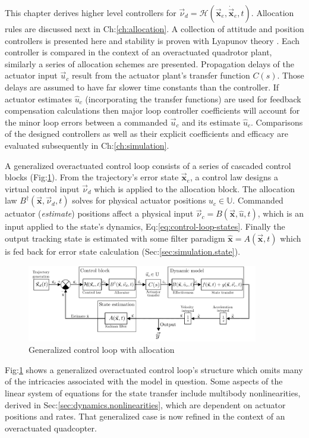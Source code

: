 This chapter derives higher level controllers for $\vec{\nu}_d=\mathcal{H}(\vec{\mathbf{x}}_e,\dot{\vec{\mathbf{x}}}_e,t)$. Allocation rules are discussed next in Ch:\ref{ch:allocation}. A collection of attitude and position controllers is presented here and stability is proven with Lyapunov theory \cite{lyapunovconference}. Each controller is compared in the context of an overactuated quadrotor plant, similarly a series of allocation schemes are presented. Propagation delays of the actuator input $\vec{u}_c$ result from the actuator plant's transfer function $C(s)$. Those delays are assumed to have far slower time constants than the controller. If actuator estimates $\hat{u}_c$ (incorporating the transfer functions) are used for feedback compensation calculations then major loop controller coefficients will account for the minor loop errors between a commanded $\vec{u}_c$ and its estimate $\hat{u}_c$. Comparisons of the designed controllers as well as their explicit coefficients and efficacy are evaluated subsequently in Ch:\ref{ch:simulation}. 
\par
A generalized overactuated control loop consists of a series of cascaded control blocks (Fig:\ref{fig:control-loop}). From the trajectory's error state $\vec{\mathbf{x}}_e$, a control law designs a virtual control input $\vec{\nu}_d$ which is applied to the allocation block. The allocation law $B^{\dagger}(\vec{\mathbf{x}},\vec{\nu}_d,t)$ solves for physical actuator positions $u_c\in\mathbb{U}$. Commanded actuator (\emph{estimate}) positions affect a physical input $\vec{\nu}_c=B(\vec{\mathbf{x}},\hat{u},t)$, which is an input applied to the state's dynamics, Eq:\ref{eq:control-loop-states}. Finally the output tracking state is estimated with some filter paradigm $\hat{\mathbf{x}}=A(\vec{\mathbf{x}},t)$ which is fed back for error state calculation (Sec:\ref{sec:simulation.state}).
\begin{figure}[htbp]
\vspace{-6pt}
\centering
\includegraphics[width=0.9\textwidth]{figs/control-loop}
\vspace{-10pt}
\caption{Generalized control loop with allocation}
\vspace{-20pt}
\label{fig:control-loop}
\end{figure}
\par
Fig:\ref{fig:control-loop} shows a generalized overactuated control loop's structure which omits many of the intricacies associated with the model in question. Some aspects of the linear system of equations for the state transfer include multibody nonlinearities, derived in Sec:\ref{sec:dynamics.nonlinearities}, which are dependent on actuator positions and rates. That generalized case is now refined in the context of an overactuated quadcopter.
